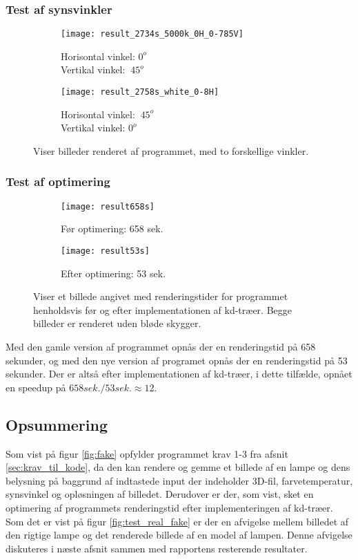 \subsubsection{Test af synsvinkler}
\begin{figure}[H]
\centering
\begin{subfigure}{.5\textwidth}
  \centering
  \texttt{[image: result\_2734s\_5000k\_0H\_0-785V]}
  \caption{Horisontal vinkel: $0^o$ \\ Vertikal vinkel: $~45^o$}
  \label{fig:one}
\end{subfigure}%
\begin{subfigure}{.5\textwidth}
  \centering
  \texttt{[image: result\_2758s\_white\_0-8H]}
  \caption{Horisontal vinkel: $~45^o$ \\ Vertikal vinkel: $0^o$}
  \label{fig:two}
\end{subfigure}
\caption{Viser billeder renderet af programmet, med to forskellige vinkler.}
\label{fig:synsvinkel}
\end{figure}

\subsubsection{Test af optimering}
\begin{figure}[H]
\centering
\begin{subfigure}{.5\textwidth}
  \centering
  \texttt{[image: result658s]}
  \caption{Før optimering: 658 sek.}
  \label{fig:slow}
\end{subfigure}%
\begin{subfigure}{.5\textwidth}
  \centering
  \texttt{[image: result53s]}
  \caption{Efter optimering: 53 sek.}
  \label{fig:fast}
\end{subfigure}
\caption{Viser et billede angivet med renderingstider for programmet henholdsvis før og efter implementationen af kd-træer. Begge billeder er renderet uden bløde skygger.}
\label{fig:optimering}
\end{figure}

Med den gamle version af programmet opnås der en renderingstid på 658 sekunder, og med den nye version af programet opnås der en renderingstid på 53 sekunder. Der er altså efter implementationen af kd-træer, i dette tilfælde, opnået en speedup på $658 sek./53 sek. \approx 12$.

\subsection*{Opsummering}
Som vist på figur \ref{fig:fake} opfylder programmet krav 1-3 fra afsnit \ref{sec:krav_til_kode}, da den kan rendere og gemme et billede af en lampe og dens belysning på baggrund af indtastede input der indeholder 3D-fil, farvetemperatur, synsvinkel og opløsningen af billedet. Derudover er der, som vist, sket en optimering af programmets renderingstid efter implementeringen af kd-træer. 
Som det er vist på figur \ref{fig:test_real_fake} er der en afvigelse mellem billedet af den rigtige lampe og det renderede billede af en model af lampen. Denne afvigelse diskuteres i næste afsnit sammen med rapportens resterende resultater. 

